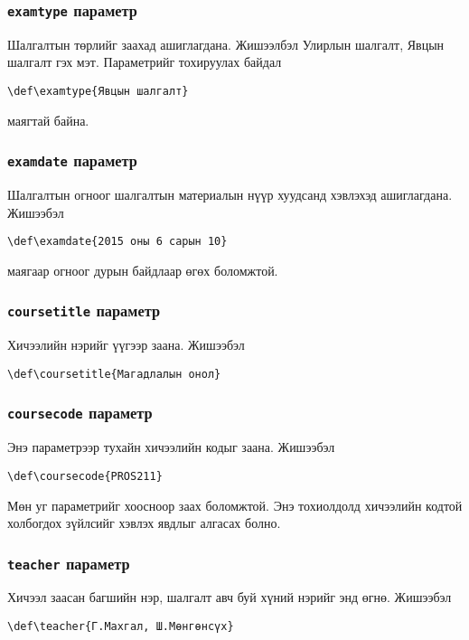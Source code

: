 \documentclass[10pt]{article}
\theoremstyle{definition}
\begin{document}
\subsubsection{\texttt{examtype} параметр}

Шалгалтын төрлийг заахад ашиглагдана. Жишээлбэл Улирлын шалгалт, Явцын шалгалт гэх мэт. Параметрийг тохируулах байдал 
\begin{verbatim}
\def\examtype{Явцын шалгалт}
\end{verbatim}
маягтай байна.

\subsubsection{\texttt{examdate} параметр}

Шалгалтын огноог шалгалтын материалын нүүр хуудсанд хэвлэхэд ашиглагдана. Жишээбэл 
\begin{verbatim}
\def\examdate{2015 оны 6 сарын 10}
\end{verbatim}
маягаар огноог дурын байдлаар өгөх боломжтой.

\subsubsection{\texttt{coursetitle} параметр}

Хичээлийн нэрийг үүгээр заана. Жишээбэл 
\begin{verbatim}
\def\coursetitle{Магадлалын онол}
\end{verbatim}

\subsubsection{\texttt{coursecode} параметр}

Энэ параметрээр тухайн хичээлийн кодыг заана. Жишээбэл
\begin{verbatim}
\def\coursecode{PROS211}
\end{verbatim}
Мөн уг параметрийг хоосноор заах боломжтой. Энэ тохиолдолд хичээлийн кодтой холбогдох зүйлсийг хэвлэх явдлыг алгасах болно.

\subsubsection{\texttt{teacher} параметр}

Хичээл заасан багшийн нэр, шалгалт авч буй хүний нэрийг энд өгнө. Жишээбэл
\begin{verbatim}
\def\teacher{Г.Махгал, Ш.Мөнгөнсүх}
\end{verbatim}
\end{document}
